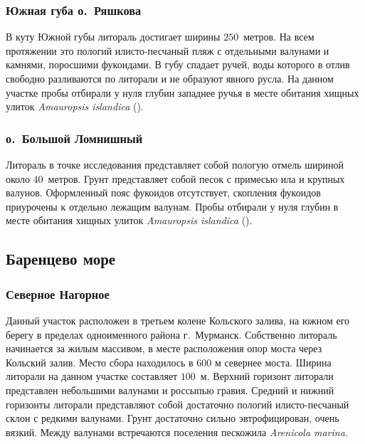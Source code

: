 \subsubsection{Южная губа о.~Ряшкова}
В куту Южной губы литораль достигает ширины $250$~метров. 
На всем протяжении это пологий илисто-песчаный пляж с отдельными валунами и камнями, поросшими фукоидами.
В губу спадает ручей, воды которого в отлив свободно разливаются по литорали и не образуют явного русла.
На данном участке пробы отбирали у нуля глубин западнее ручья в месте обитания хищных улиток \textit{Amauropsis islandica} (\cite{Aristov_Granovich_2011}).


\subsubsection{о.~Большой Ломнишный}
Литораль в точке исследования представляет собой пологую отмель шириной около $40$~метров.
Грунт представляет собой песок с примесью ила и крупных валунов.
Оформленный пояс фукоидов отсутствует, скопления фукоидов приурочены к отдельно лежащим валунам.
Пробы отбирали у нуля глубин в месте обитания хищных улиток \textit{Amauropsis islandica} (\cite{Aristov_Granovich_2011}).



            \subsection{Баренцево море}

            \subsubsection{Северное Нагорное}
Данный участок расположен в третьем колене Кольского залива, на южном его берегу в пределах одноименного района г.~Мурманск. 
Собственно литораль начинается за жилым массивом, в месте расположения опор моста через Кольский залив. 
Место сбора находилось в 600 м севернее моста. 
Ширина литорали на данном участке составляет $100$~м. 
Верхний горизонт литорали представлен небольшими валунами и россыпью гравия. 
Средний и нижний горизонты литорали представляют собой достаточно пологий илисто-песчаный склон с редкими валунами. 
Грунт достаточно сильно эвтрофицирован, очень вязкий. 
Между валунами встречаются поселения пескожила {\it Arenicola marina}.

